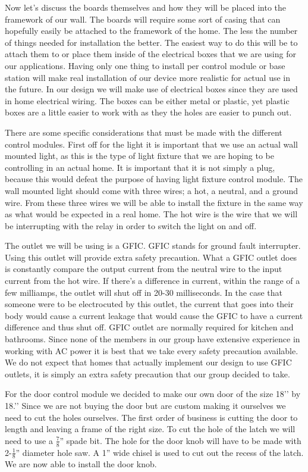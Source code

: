 Now let{}'s discuss the boards themselves and how they will be placed into the
framework of our wall. The boards will require some sort of casing that can
hopefully easily be attached to the framework of the home. The less the number
of things needed for installation the better. The easiest way to do this will
be to attach them to or place them inside of the electrical boxes that we are
using for our applications. Having only one thing to install per control module
or base station will make real installation of our device more realistic for
actual use in the future. In our design we will make use of electrical boxes
since they are used in home electrical wiring. The boxes can be either metal or
plastic, yet plastic boxes are a little easier to work with as they the holes
are easier to punch out.
\cite{link15}

There are some specific considerations that must be made with the different
control modules. First off for the light it is important that we use an actual
wall mounted light, as this is the type of light fixture that we are hoping to
be controlling in an actual home. It is important that it is not simply a plug,
because this would defeat the purpose of having light fixture control module.
The wall mounted light should come with three wires; a hot, a neutral, and a
ground wire. From these three wires we will be able to install the fixture in
the same way as what would be expected in a real home. The hot wire is the wire
that we will be interrupting with the relay in order to switch the light on and
off.

The outlet we will be using is a GFIC. GFIC stands for ground fault
interrupter. Using this outlet will provide extra safety precaution. What a
GFIC outlet does is constantly compare the output current from the neutral wire
to the input current from the hot wire. If there{}'s a difference in current,
within the range of a few milliamps, the outlet will shut off in 20-30
milliseconds. In the case that someone were to be electrocuted by this outlet,
the current that goes into their body would cause a current leakage that would
cause the GFIC to have a current difference and thus shut off.  GFIC outlet are
normally required for kitchen and bathrooms. Since none of the members in our
group have extensive experience in working with AC power it is best that we
take every safety precaution available. We do not expect that homes that
actually implement our design to use GFIC outlets, it is simply an extra safety
precaution that our group decided to take. \cite{link16}


For the door control module we decided to make our own door of the size 18'{}'
by 18.'{}' Since we are not buying the door but are custom making it ourselves
we need to cut the holes ourselves. The first order of business is cutting the
door to length and leaving a frame of the right size. To cut the hole of the
latch we will need to use a $\frac78$'' spade bit. The hole for the door knob
will have to be made with 2-$\frac18$'' diameter hole saw. A 1'' wide chisel is
used to cut out the recess of the latch. We are now able to install the door
knob.
